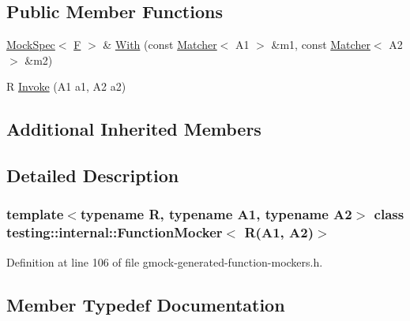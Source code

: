 \subsection*{Public Member Functions}
\begin{DoxyCompactItemize}
\item 
\hyperlink{classtesting_1_1internal_1_1MockSpec}{Mock\+Spec}$<$ \hyperlink{classtesting_1_1internal_1_1FunctionMocker_3_01R_07A1_00_01A2_08_4_a61302610bfc9b30588ea345e468310b2}{F} $>$ \& \hyperlink{classtesting_1_1internal_1_1FunctionMocker_3_01R_07A1_00_01A2_08_4_a7e17361fadc89120c1254826baa3200e}{With} (const \hyperlink{classtesting_1_1Matcher}{Matcher}$<$ A1 $>$ \&m1, const \hyperlink{classtesting_1_1Matcher}{Matcher}$<$ A2 $>$ \&m2)
\item 
R \hyperlink{classtesting_1_1internal_1_1FunctionMocker_3_01R_07A1_00_01A2_08_4_a518f5ac78887c64580343554aaae8f44}{Invoke} (A1 a1, A2 a2)
\end{DoxyCompactItemize}
\subsection*{Additional Inherited Members}


\subsection{Detailed Description}
\subsubsection*{template$<$typename R, typename A1, typename A2$>$\newline
class testing\+::internal\+::\+Function\+Mocker$<$ R(\+A1, A2)$>$}



Definition at line 106 of file gmock-\/generated-\/function-\/mockers.\+h.



\subsection{Member Typedef Documentation}
\mbox{\label{classtesting_1_1internal_1_1FunctionMocker_3_01R_07A1_00_01A2_08_4_ae75e3ba40a99224f7363681914212c19}} 
